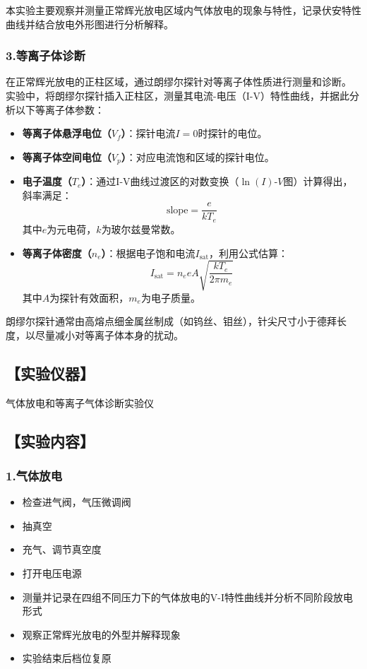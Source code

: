 \documentclass[12pt,a4paper,UTF8]{ctexart}
\begin{document}
本实验主要观察并测量正常辉光放电区域内气体放电的现象与特性，记录伏安特性曲线并结合放电外形图进行分析解释。

\subsubsection*{3.等离子体诊断}

在正常辉光放电的正柱区域，通过朗缪尔探针对等离子体性质进行测量和诊断。
实验中，将朗缪尔探针插入正柱区，测量其电流-电压（I-V）特性曲线，并据此分析以下等离子体参数：

\begin{itemize}
    \item \textbf{等离子体悬浮电位（$V_f$）}：探针电流$I=0$时探针的电位。
    \item \textbf{等离子体空间电位（$V_p$）}：对应电流饱和区域的探针电位。
    \item \textbf{电子温度（$T_e$）}：通过I-V曲线过渡区的对数变换（$\ln(I)$-$V$图）计算得出，斜率满足：
    \begin{equation}
        \text{slope} = \frac{e}{kT_e}
    \end{equation}
    其中$e$为元电荷，$k$为玻尔兹曼常数。
    \item \textbf{等离子体密度（$n_e$）}：根据电子饱和电流$I_{\text{sat}}$，利用公式估算：
    \begin{equation}
        I_{\text{sat}} = n_e e A \sqrt{\frac{kT_e}{2\pi m_e}}
    \end{equation}
    其中$A$为探针有效面积，$m_e$为电子质量。
\end{itemize}

朗缪尔探针通常由高熔点细金属丝制成（如钨丝、钼丝），针尖尺寸小于德拜长度，以尽量减小对等离子体本身的扰动。

\subsection*{【实验仪器】}
气体放电和等离子气体诊断实验仪

\subsection*{【实验内容】}
\cite{smartprobe2002manual}
\subsubsection*{1.气体放电}
\begin{itemize}
	\item 检查进气阀，气压微调阀
	\item 抽真空
	\item 充气、调节真空度
	\item 打开电压电源
	\item 测量并记录在四组不同压力下的气体放电的V-I特性曲线并分析不同阶段放电形式
	\item 观察正常辉光放电的外型并解释现象
	\item 实验结束后档位复原
\end{itemize}
\end{document}
